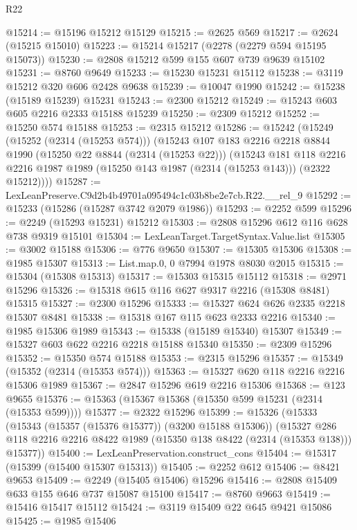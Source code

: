 \begin{lexlean}{R22}
\begin{coremodule}
@15214 := @15196 @15212 @15129
@15215 := @2625 @569
@15217 := @2624 (@15215 @15010)
@15223 := @15214 @15217 (@2278 (@2279 @594 @15195 @15073))
@15230 := @2808 @15212 @599 @155 @607 @739 @9639 @15102
@15231 := @8760 @9649
@15233 := @15230 @15231 @15112
@15238 := @3119 @15212 @320 @606 @2428 @9638
@15239 := @10047 @1990
@15242 := @15238 (@15189 @15239) @15231
@15243 := @2300 @15212
@15249 := @15243 @603 @605 @2216 @2333 @15188 @15239
@15250 := @2309 @15212
@15252 := @15250 @574 @15188
@15253 := @2315 @15212
@15286 := @15242
    (@15249
      (@15252 (@2314 (@15253 @574)))
      (@15243
        @107
        @183
        @2216
        @2218
        @8844
        @1990
        (@15250 @22 @8844 (@2314 (@15253 @22)))
        (@15243
          @181
          @118
          @2216
          @2216
          @1987
          @1989
          (@15250 @143 @1987 (@2314 (@15253 @143)))
          (@2322 @15212))))
@15287 := LexLeanPreserve.C9d2b4b49701a095494c1c03b8be2e7cb.R22.__rel_9
@15292 := @15233 (@15286 (@15287 @3742 @2079 @1986))
@15293 := @2252 @599
@15296 := @2249 (@15293 @15231) @15212
@15303 := @2808 @15296 @612 @116 @628 @738 @9319 @15101
@15304 := LexLeanTarget.TargetSyntax.Value.list
@15305 := @3002 @15188
@15306 := @776 @9650
@15307 := @15305 @15306
@15308 := @1985 @15307
@15313 := List.map.{0, 0} @7994 @1978 @8030 @2015
@15315 := @15304 (@15308 @15313)
@15317 := @15303 @15315 @15112
@15318 := @2971 @15296
@15326 := @15318 @615 @116 @627 @9317 @2216 (@15308 @8481) @15315
@15327 := @2300 @15296
@15333 := @15327 @624 @626 @2335 @2218 @15307 @8481
@15338 := @15318 @167 @115 @623 @2333 @2216
@15340 := @1985 @15306 @1989
@15343 := @15338 (@15189 @15340) @15307
@15349 := @15327 @603 @622 @2216 @2218 @15188 @15340
@15350 := @2309 @15296
@15352 := @15350 @574 @15188
@15353 := @2315 @15296
@15357 := @15349 (@15352 (@2314 (@15353 @574)))
@15363 := @15327 @620 @118 @2216 @2216 @15306 @1989
@15367 := @2847 @15296 @619 @2216 @15306
@15368 := @123 @9655
@15376 := @15363 (@15367 @15368 (@15350 @599 @15231 (@2314 (@15353 @599))))
@15377 := @2322 @15296
@15399 := @15326
    (@15333
      (@15343 (@15357 (@15376 @15377)) (@3200 @15188 @15306))
      (@15327 @286 @118 @2216 @2216 @8422 @1989 (@15350 @138 @8422 (@2314 (@15353 @138))) @15377))
@15400 := LexLeanPreservation.construct_cons
@15404 := @15317 (@15399 (@15400 @15307 @15313))
@15405 := @2252 @612
@15406 := @8421 @9653
@15409 := @2249 (@15405 @15406) @15296
@15416 := @2808 @15409 @633 @155 @646 @737 @15087 @15100
@15417 := @8760 @9663
@15419 := @15416 @15417 @15112
@15424 := @3119 @15409 @22 @645 @9421 @15086
@15425 := @1985 @15406

\end{coremodule}
\end{lexlean}
